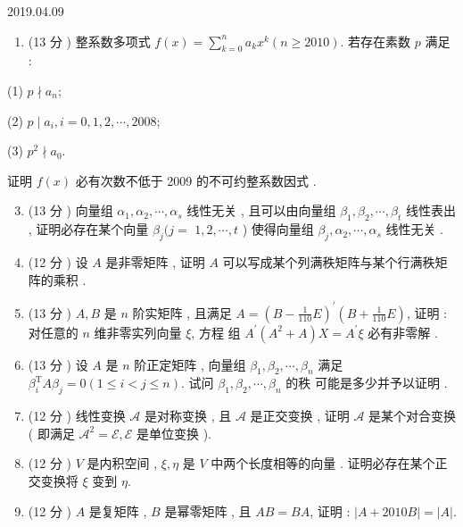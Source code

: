 \documentclass[10pt]{article}
\begin{document}
   

2019.04.09

\begin{enumerate}
  \item (13 分 )  整系数多项式  $f(x)=\sum_{k=0}^{n} a_{k} x^{k}(n \geq 2010)$.  若存在素数  $p$  满足 :
\end{enumerate}
(1) $p \nmid a_{n}$;

(2) $p \mid a_{i}, i=0,1,2, \cdots, 2008$;

(3) $p^{2} \nmid a_{0}$.

 证明  $f(x)$  必有次数不低于  2009  的不可约整系数因式 .

\begin{enumerate}
  \setcounter{enumi}{2}
  \item (13 分 )  向量组  $\alpha_{1}, \alpha_{2}, \cdots, \alpha_{s}$  线性无关 ,  且可以由向量组  $\beta_{1}, \beta_{2}, \cdots, \beta_{t}$  线性表出 ,  证明必存在某个向量  $\beta_{j}(j=$ $1,2, \cdots, t$ )  使得向量组  $\beta_{j}, \alpha_{2}, \cdots, \alpha_{s}$  线性无关 .

  \item (12 分 )  设  $A$  是非零矩阵 ,  证明  $A$  可以写成某个列满秩矩阵与某个行满秩矩阵的乘积 .

  \item (13 分 ) $A, B$  是  $n$  阶实矩阵 ,  且满足  $A=\left(B-\frac{1}{110} E\right)^{\prime}\left(B+\frac{1}{110} E\right)$,  证明 : 对任意的  $n$  维非零实列向量  $\xi$,  方程   组  $A^{\prime}\left(A^{2}+A\right) X=A^{\prime} \xi$  必有非零解 .

  \item (13 分 )  设  $A$  是  $n$  阶正定矩阵 ,  向量组  $\beta_{1}, \beta_{2}, \cdots, \beta_{n}$  满足  $\beta_{i}^{\mathrm{T}} A \beta_{j}=0(1 \leq i<j \leq n)$.  试问  $\beta_{1}, \beta_{2}, \cdots, \beta_{n}$  的秩   可能是多少并予以证明 .

  \item (12 分 )  线性变换  $\mathscr{A}$  是对称变换 ,  且  $\mathscr{A}$  是正交变换 ,  证明  $\mathscr{A}$  是某个对合变换  ( 即满足  $\mathscr{A}^{2}=\mathscr{E}, \mathscr{E}$  是单位变换 ).

  \item (12 分 ) $V$  是内积空间 , $\xi, \eta$  是  $V$  中两个长度相等的向量 .  证明必存在某个正交变换将  $\xi$  变到  $\eta$.

  \item (12 分 ) $A$  是复矩阵 , $B$  是幂零矩阵 ,  且  $A B=B A$,  证明 : $|A+2010 B|=|A|$.


\end{enumerate}
\end{document}
